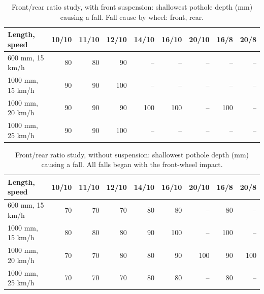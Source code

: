 \begin{table}[htbp]
\centering\small
\caption{Front/rear ratio study, with front suspension: shallowest pothole depth (mm) causing a fall. Fall cause by wheel: front, rear.}\label{tab:Eratiofork}
\begin{tabular}{@{}lrrrrrrrr@{}}
\toprule
Length, speed & 10/10 & 11/10 & 12/10 & 14/10 & 16/10 & 20/10 & 16/8 & 20/8 \\
\midrule
600 mm, 15 km/h & 80 & 80 & 90 & -- & -- & -- & -- & -- \\
1000 mm, 15 km/h & 90 & 90 & 100 & -- & -- & -- & -- & -- \\
1000 mm, 20 km/h & 90 & 90 & 90 & 100 & 100 & -- & 100 & -- \\
1000 mm, 25 km/h & 90 & 90 & 100 & -- & -- & -- & -- & -- \\
\bottomrule
\end{tabular}
\end{table}

\begin{table}[htbp]
\centering\small
\caption{Front/rear ratio study, without suspension: shallowest pothole depth (mm) causing a fall. All falls began with the front-wheel impact.}\label{tab:Eration}
\begin{tabular}{@{}lrrrrrrrr@{}}
\toprule
Length, speed & 10/10 & 11/10 & 12/10 & 14/10 & 16/10 & 20/10 & 16/8 & 20/8 \\
\midrule
600 mm, 15 km/h & 70 & 70 & 70 & 80 & 80 & -- & 80 & -- \\
1000 mm, 15 km/h & 80 & 80 & 80 & 90 & 100 & -- & 100 & -- \\
1000 mm, 20 km/h & 70 & 70 & 80 & 80 & 90 & 100 & 90 & 100 \\
1000 mm, 25 km/h & 70 & 70 & 70 & 80 & 80 & -- & 80 & -- \\
\bottomrule
\end{tabular}
\end{table}


